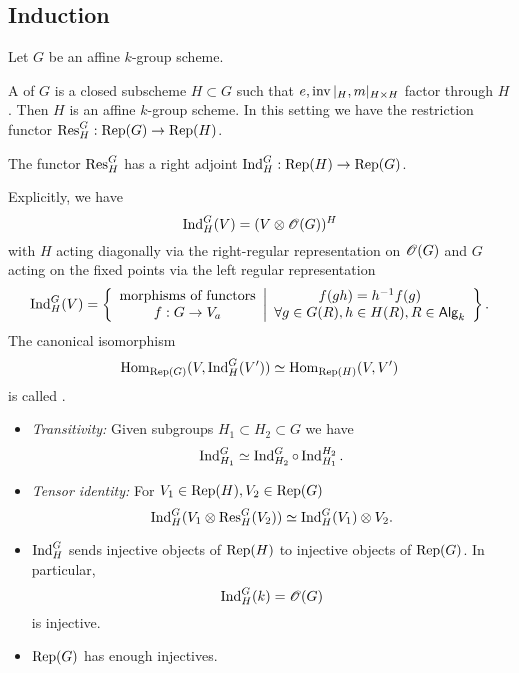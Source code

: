 	\subsection{Induction} Let $G$ be an affine $k$-group scheme.

	A  of $G$ is a closed subscheme $H\subset G$ such that
	$e,\operatorname{inv}|_{H},m|_{H\times H}$ factor through $H$. Then $H$ is an affine $k$-group scheme.
	In this setting we have the restriction functor $\Res_{H}^{G}:\Rep(G)\to \Rep(H)$.

	\begin{proposition}
		The functor $\operatorname{Res}_{H}^{G}$ has a right adjoint $\Ind_{H}^{G}:\Rep(H)\to \Rep(G)$.
	\end{proposition}
	Explicitly, we have
	\[
		\operatorname{Ind}_{H}^{G}(V) = (V\otimes\mathscr{O}(G))^H
	\]
	with $H$ acting diagonally via the right-regular representation on $\mathscr{O}(G)$ and $G$
	acting on the fixed points via the left regular representation
	\[
		\Ind_{H}^{G}(V) = \left\{
			\begin{array}{c}
				\text{morphisms of functors} \\
				f :G\to V_{a}
			\end{array} \middle|
			\begin{array}{c}
				f(gh)=h^{-1}f(g) \\
				\forall g\in G(R), h\in H(R), R\in \cat{Alg}_k
		\end{array} \right\}
	.\]
	The canonical isomorphism
	\[
		\operatorname{Hom}_{\operatorname{Rep}(G)}(V,\operatorname{Ind}_{H}^{G}(V')) \simeq \operatorname{Hom}_{\operatorname{Rep}(H)}(V,V')
	\]
	is called .

	\begin{properties} \leavevmode
		\begin{itemize}
			\item \emph{Transitivity:} Given subgroups $H_1\subset H_2\subset G$ we have
				\[
					\operatorname{Ind}_{H_1}^{G} \simeq \operatorname{Ind}_{H_2}^{G}\circ \operatorname{Ind}_{H_1}^{H_2}.
				\]
			\item \emph{Tensor identity:} For $V_1\in \operatorname{Rep}(H),V_2\in \operatorname{Rep}(G)$
				\[
					\operatorname{Ind}_{H}^{G}(V_1\otimes\operatorname{Res}_{H}^{G}(V_2)) \simeq \operatorname{Ind}_{H}^{G}(V_1) \otimes V_2.
				\]
			\item $\operatorname{Ind}_H^{G}$ sends injective objects of $\operatorname{Rep}(H)$ to injective objects of
				$\operatorname{Rep}(G)$. In particular,
				\[
					\operatorname{Ind}_H^{G}(k) = \mathscr{O}(G)
				\]
				is injective.
			\item $\operatorname{Rep}(G)$ has enough injectives.
		\end{itemize}
	\end{properties}

